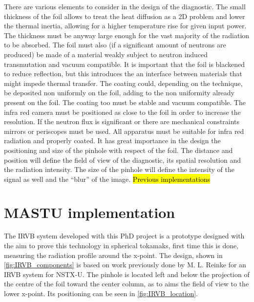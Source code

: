 There are various elements to consider in the design of the diagnostic.
The small thickness of the foil allows to treat the heat diffusion as a 2D problem and lower the thermal inertia, allowing for a higher temperature rise for given input power. The thickness must be anyway large enough for the vast majority of the radiation to be absorbed. The foil must also (if a significant amount of neutrons are produced) be made of a material weakly subject to neutron induced transmutation and vacuum compatible.\cite{Mukai2021}
It is important that the foil is blackened to reduce reflection, but this introduces the an interface between materials that might impede thermal transfer. The coating could, depending on the technique, be deposited non uniformly on the foil, adding to the non uniformity already present on the foil. The coating too must be stable and vacuum compatible. \cite{Mukai2016}
The infra red camera must be positioned as close to the foil in order to increase the resolution. If the neutron flux is significant or there are mechanical constraints mirrors or periscopes must be used. All apparatus must be suitable for infra red radiation and properly coated.
It has great importance in the design the positioning and size of the pinhole with respect of the foil. The distance and position will define the field of view of the diagnostic, its spatial resolution and the radiation intensity. The size of the pinhole will define the intensity of the signal as well and the “blur” of the image.
\hl{Previous implementations}


\section{MASTU implementation}

The IRVB system developed with this PhD project is a prototype designed with the aim to prove this technology in spherical tokamaks, first time this is done, measuring the radiation profile around the x-point. The design, shown in \autoref{fig:IRVB_components} is based on work previously done by M. L. Reinke for an IRVB system for NSTX-U.\cite{VanEden2016} The pinhole is located left and below the projection of the centre of the foil toward the center column, as to aims the field of view to the lower x-point. Its positioning can be seen in \autoref{fig:IRVB_location}.


